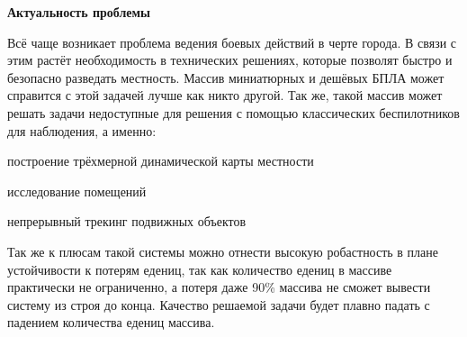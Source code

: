 \begin{slide}

    \makeatletter
    \let\@topfil\relax
    \makeatother

    \textbf{Актуальность проблемы}

    Всё чаще возникает проблема ведения боевых действий
    в черте города. В связи с этим растёт необходимость в технических
    решениях, которые позволят быстро и безопасно разведать местность.
    Массив миниатюрных и дешёвых БПЛА может справится с этой задачей 
    лучше как никто другой. Так же, такой массив может решать задачи недоступные
    для решения с помощью классических беспилотников для наблюдения, а именно: 
    \begin{mintemize}
        \item построение трёхмерной динамической карты местности
        \item исследование помещений
        \item непрерывный трекинг подвижных объектов
    \end{mintemize}

    Так же к плюсам такой системы можно отнести высокую робастность в плане
    устойчивости к потерям едениц, так как количество едениц в массиве
    практически не ограниченно, а потеря даже 90\% массива не сможет
    вывести систему из строя до конца.  Качество решаемой задачи
    будет плавно падать с падением количества едениц массива.
\end{slide}

